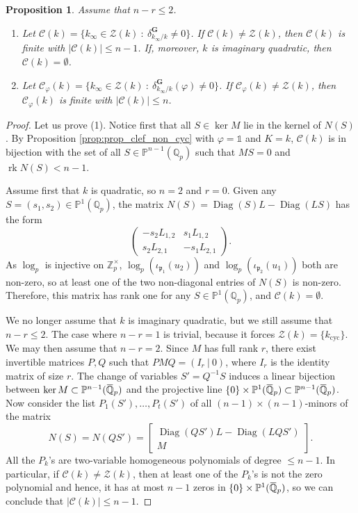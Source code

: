 \documentclass[12pt]{amsart}
\newcommand{\Q}{\mathbb{Q}}
\newcommand{\Z}{\mathbb{Z}}
\newcommand\bP{\mathbb{P}}
\newcommand\Qp{{\mathbb{Q}_p}}
\newcommand\gp{\mathfrak{p}}
\newcommand\sC{\mathscr{C}}
\newcommand\sZ{\mathscr{Z}}
\newcommand{\ob}[1]{\mkern 1.5mu\overline{\mkern-1.5mu#1\mkern-1.5mu}\mkern 1.5mu}
\DeclareMathOperator{\rk}{rk}
\DeclareMathOperator{\Diag}{Diag}
\newcommand{\cyc}{\textrm{cyc}}
\theoremstyle{defstyle}
\theoremstyle{thmstyle}
\newtheorem{proposition}[subsubsection]{Proposition}
\begin{document}
	\begin{proposition}\label{prop:non_cyc_trivial_char}
		Assume that $n-r\leq 2$. \begin{enumerate}
			\item  Let $\sC(k)=\{k_\infty\in\sZ(k) \ \colon\ \delta_{k_\infty/k}^\textbf{G}\neq 0\}$. If $\sC(k)\neq \sZ(k)$, then $\sC(k)$ is finite with $|\sC(k)|\leq n-1$. If, moreover, $k$ is imaginary quadratic, then $\sC(k)=\emptyset$.
			\item Let  $\sC_\varphi(k)=\{k_\infty\in\sZ(k) \ \colon\ \delta_{k_\infty/k}^\textbf{G}(\varphi)\neq 0\}$. If $\sC_\varphi(k)\neq \sZ(k)$, then $\sC_\varphi(k)$ is finite with $|\sC(k)|\leq n$.
		\end{enumerate}
	\end{proposition}
	\begin{proof}
		Let us prove (1). Notice first that all $S\in \ker M$ lie in the kernel of $N(S)$. By Proposition \ref{prop:prop_clef_non_cyc} with $\varphi=\mathds{1}$ and $K=k$, $\sC(k)$ is in bijection with the set of all $S\in \bP^{n-1}(\Qp)$ such that $MS=0$ and $\rk N(S)<n-1$.
		
		Assume first that $k$ is quadratic, so $n=2$ and $r=0$. Given any $S=(s_1,s_2)\in \bP^1(\Qp)$, the matrix $N(S)=\Diag(S)L - \Diag(LS)$ has the form 
		\[\begin{pmatrix}
			-s_2L_{1,2} & s_1 L_{1,2} \\ s_2 L_{2,1} & -s_1 L_{2,1}
		\end{pmatrix}.\]
		As $\log_p$ is injective on $\Z_p^\times$, $\log_p(\iota_{\gp_1}(u_2))$ and $\log_p(\iota_{\gp_2}(u_1))$ both are non-zero, so at least one of the two non-diagonal entries of $N(S)$ is non-zero. Therefore, this matrix has rank one for any $S\in \bP^1(\Qp)$, and $\sC(k)=\emptyset$.
		
		We no longer assume that $k$ is imaginary quadratic, but we still assume that $n-r\leq 2$. The case where $n-r=1$ is trivial, because it forces $\sZ(k)=\{k_{\cyc}\}$. We may then assume that $n-r=2$. Since $M$ has full rank $r$, there exist invertible matrices $P,Q$ such that $PMQ=\left( I_r\ | \ 0\right)$, where $I_r$ is the identity matrix of size $r$. The change of variables $S'=Q^{-1}S$ induces a linear bijection between $\ker M \subset \bP^{n-1}(\ob{\Q}_p)$ and the projective line $\{0\} \times \bP^{1}(\ob{\Q}_p) \subset \bP^{n-1}(\ob{\Q}_p)$. Now consider the list $P_1(S'),\ldots,P_t(S')$ of all $(n-1)\times(n-1)$-minors of the matrix	
		\[N(S)=N(QS')=\begin{bmatrix}
			\Diag(QS')L- \Diag(LQS')\\
			M
		\end{bmatrix}.\]
		All the $P_k$'s are two-variable homogeneous polynomials of degree $\leq n-1$. In particular, if $\sC(k)\neq \sZ(k)$, then at least one of the $P_k$'s is not the zero polynomial and hence, it has at most $n-1$ zeros in $\{0\} \times \bP^{1}(\ob{\Q}_p)$, so we can conclude that $|\sC(k)|\leq n-1$.
		

\end{proof}
\end{document}
